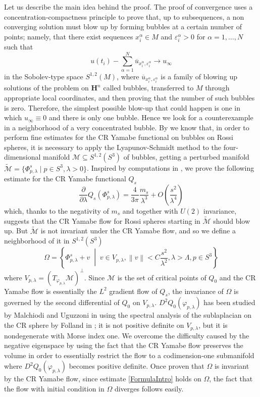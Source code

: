 \documentclass[a4paper,12pt]{amsart}
\renewcommand{\phi}{\varphi}
\newcommand{\de}{\partial}
\newcommand{\ci}[1]{\mathscr{#1}}%
\newcommand{\N}[1]{\left\lVert#1\right\rVert}
\renewcommand{\H}{\mathbf{H}}
\newcommand{\e}{\varepsilon}
\begin{document}
Let us describe the main idea behind the proof.
 The proof of convergence uses a concentration-compactness principle to prove that, up to subsequences, a non converging solution must blow up by forming bubbles at a certain number of points; namely, that there exist sequences $x_i^{\alpha}\in M$ and $\e_i^{\alpha}>0$ for $\alpha=1,\ldots,N$ such that
$$u(t_i) - \sum_{\alpha=1}^N\overline{u}_{x_i^{\alpha},\e_i^{\alpha}} \to u_{\infty}$$
in the Sobolev-type space $S^{1,2}(M)$, where $\overline{u}_{x_i^{\alpha},\e_i^{\alpha}}$ is a family of blowing up solutions of the problem on $\H^n$ called bubbles, transferred to $M$ through appropriate local coordinates, and then proving that the number of such bubbles is zero. Therefore, the simplest possible blow-up that could happen is one in which $u_{\infty}\equiv 0$ and there is only one bubble.
Hence we look for a counterexample in a neighborhood of  a very concentrated bubble.
By \cite{CMY2} we know that, in order to perform fine estimates for the CR Yamabe functional on bubbles on Rossi spheres, it is necessary to apply the Lyapunov-Schmidt method to the four-dimensional manifold $\ci{M}\subseteq S^{1,2}(S^3)$ of bubbles, getting a perturbed manifold $\widetilde{\ci{M}}=\{\Phi_{p,\lambda}^s\;|\;p\in S^3,\lambda>0\}$.
Inspired by computations in \cite{CMY2}, we prove the following estimate for the CR Yamabe functional $Q_s$
\begin{equation}\label{FormulaIntro}
    \frac{\de}{\de\lambda}Q_s(\Phi_{p,\lambda}^s) = \frac{4}{3\pi}\frac{m_s}{\lambda^3} + O\left(\frac{s^2}{\lambda^4}\right)
\end{equation}
 which, thanks to the negativity of $m_s$ and together with $U(2)$ invariance, suggests that the CR Yamabe flow for Rossi spheres starting in $\widetilde{\ci{M}}$ should blow up.
But $\widetilde{\ci{M}}$ is not invariant under the CR Yamabe flow, and so we define a neighborhood of it in $S^{1,2}(S^3)$
$$\Omega=\left\{\Phi_{p,\lambda}^s+v\;\middle|\; v\in V_{p,\lambda}, \N{v}<C\frac{s^2}{\lambda^2}, \lambda>\Lambda,p\in S^3
\right\}$$
where $V_{p,\lambda}=(T_{\phi_{p,\lambda}}\ci{M})^{\perp}$. Since $\ci{M}$ is the set of critical points of $Q_0$ and the CR Yamabe flow is essentially the $L^2$ gradient flow of $Q_s$, the invariance of $\Omega$ is governed by the second differential of $Q_0$ on $V_{p,\lambda}$.
$D^2Q_0(\phi_{p,\lambda})$ has been studied by Malchiodi and Uguzzoni in \cite{MU} using the spectral analysis of the sublaplacian on the CR sphere by Folland in \cite{F}; it is not positive definite on $V_{p,\lambda}$, but it is nondegenerate with Morse index one. We overcome the difficulty caused by the negative eigenspace by using the fact that the CR Yamabe flow preserves the volume in order to essentially restrict the flow to a codimension-one submanifold where $D^2Q_0(\phi_{p,\lambda})$ becomes positive definite.
Once proven that $\Omega$ is invariant by the CR Yamabe flow, since estimate \eqref{FormulaIntro} holds on $\Omega$, the fact that the flow with initial condition in $\Omega$ diverges follows easily.
\end{document}
